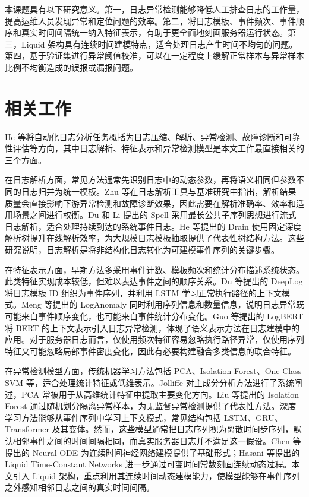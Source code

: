 本课题具有以下研究意义。第一，日志异常检测能够降低人工排查日志的工作量，提高运维人员发现异常和定位问题的效率。第二，将日志模板、事件频次、事件顺序和真实时间间隔统一纳入特征表示，有助于更全面地刻画服务器运行状态。第三，Liquid 架构具有连续时间建模特点，适合处理日志产生时间不均匀的问题。第四，基于验证集进行异常阈值校准，可以在一定程度上缓解正常样本与异常样本比例不均衡造成的误报或漏报问题。

\section{相关工作}

He 等将自动化日志分析任务概括为日志压缩、解析、异常检测、故障诊断和可靠性评估等方向，其中日志解析、特征表示和异常检测模型是本文工作最直接相关的三个方面\cite{he2021survey}。

在日志解析方面，常见方法通常先识别日志中的动态参数，再将语义相同但参数不同的日志归并为统一模板。Zhu 等在日志解析工具与基准研究中指出，解析结果质量会直接影响下游异常检测和故障诊断效果，因此需要在解析准确率、效率和适用场景之间进行权衡\cite{zhu2019tools}。Du 和 Li 提出的 Spell 采用最长公共子序列思想进行流式日志解析，适合处理持续到达的系统事件日志\cite{du2016spell}。He 等提出的 Drain 使用固定深度解析树提升在线解析效率，为大规模日志模板抽取提供了代表性树结构方法\cite{he2017drain}。这些研究说明，日志解析是将非结构化日志转化为可建模事件序列的关键步骤。

在特征表示方面，早期方法多采用事件计数、模板频次和统计分布描述系统状态。此类特征实现成本较低，但难以表达事件之间的顺序关系。Du 等提出的 DeepLog 将日志模板 ID 组织为事件序列，并利用 LSTM 学习正常执行路径的上下文模式\cite{du2017deeplog}。Meng 等提出的 LogAnomaly 同时利用序列信息和数量信息，说明日志异常既可能来自事件顺序变化，也可能来自事件统计分布变化\cite{meng2019loganomaly}。Guo 等提出的 LogBERT 将 BERT 的上下文表示引入日志异常检测，体现了语义表示方法在日志建模中的应用\cite{guo2021logbert}。对于服务器日志而言，仅使用频次特征容易忽略执行路径异常，仅使用序列特征又可能忽略局部事件密度变化，因此有必要构建融合多类信息的联合特征。

在异常检测模型方面，传统机器学习方法包括 PCA、Isolation Forest、One-Class SVM 等，适合处理统计特征或低维表示。Jolliffe 对主成分分析方法进行了系统阐述，PCA 常被用于从高维统计特征中提取主要变化方向\cite{jolliffe2002pca}。Liu 等提出的 Isolation Forest 通过随机划分隔离异常样本，为无监督异常检测提供了代表性方法\cite{liu2008isolation}。深度学习方法能够从事件序列中学习上下文模式，常见结构包括 LSTM、GRU、Transformer 及其变体。然而，这些模型通常把日志序列视为离散时间步序列，默认相邻事件之间的时间间隔相同，而真实服务器日志并不满足这一假设。Chen 等提出的 Neural ODE 为连续时间神经网络建模提供了基础形式\cite{chen2018neuralode}；Hasani 等提出的 Liquid Time-Constant Networks 进一步通过可变时间常数刻画连续动态过程\cite{hasani2021liquid}。本文引入 Liquid 架构，重点利用其连续时间动态建模能力，使模型能够在事件序列之外感知相邻日志之间的真实时间间隔。


